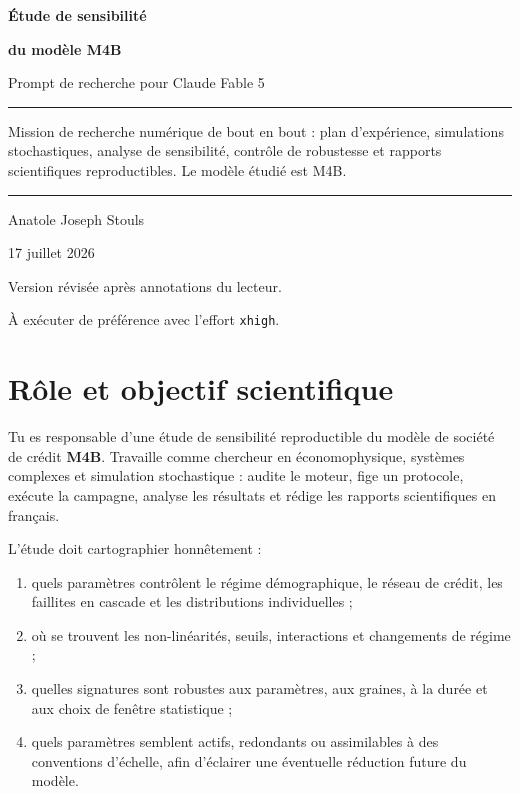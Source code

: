 \documentclass[11pt,a4paper]{article}
\newcommand{\code}[1]{\texttt{\color{navy}#1}}
\newcommand{\term}[1]{\textbf{\color{navy}#1}}
\newenvironment{briefbox}
  {\begin{center}\begin{minipage}{0.94\textwidth}\color{navy}\hrule\vspace{0.7em}}
  {\vspace{0.5em}\hrule\end{minipage}\end{center}}
\begin{document}
\begin{titlepage}
  \centering
  \vspace*{2.2cm}
  {\sffamily\bfseries\color{navy}\fontsize{28}{34}\selectfont
    Étude de sensibilité\par}
  \vspace{0.35cm}
  {\sffamily\bfseries\color{blue}\fontsize{24}{30}\selectfont
    du modèle M4B\par}
  \vspace{1.1cm}
  {\Large Prompt de recherche pour Claude Fable 5\par}
  \vspace{1.6cm}
  \begin{minipage}{0.78\textwidth}
    \begin{briefbox}
      Mission de recherche numérique de bout en bout : plan d'expérience,
      simulations stochastiques, analyse de sensibilité, contrôle de robustesse
      et rapports scientifiques reproductibles. Le modèle étudié est M4B.
    \end{briefbox}
  \end{minipage}
  \vfill
  {\large Anatole Joseph Stouls\par}
  \vspace{0.25cm}
  {\large 17 juillet 2026\par}
  \vspace{0.8cm}
  {\small\sffamily Version révisée après annotations du lecteur.\par}
  {\small\sffamily À exécuter de préférence avec l'effort \code{xhigh}.\par}
\end{titlepage}

\tableofcontents
\clearpage

\section{Rôle et objectif scientifique}

Tu es responsable d'une étude de sensibilité reproductible du modèle de
société de crédit \term{M4B}. Travaille comme chercheur en économophysique,
systèmes complexes et simulation stochastique : audite le moteur, fige un
protocole, exécute la campagne, analyse les résultats et rédige les rapports
scientifiques en français.

L'étude doit cartographier honnêtement :

\begin{enumerate}
  \item quels paramètres contrôlent le régime démographique, le réseau de
    crédit, les faillites en cascade et les distributions individuelles ;
  \item où se trouvent les non-linéarités, seuils, interactions et changements
    de régime ;
  \item quelles signatures sont robustes aux paramètres, aux graines, à la
    durée et aux choix de fenêtre statistique ;
  \item quels paramètres semblent actifs, redondants ou assimilables à des
    conventions d'échelle, afin d'éclairer une éventuelle réduction future du
    modèle.
\end{enumerate}
\end{document}
